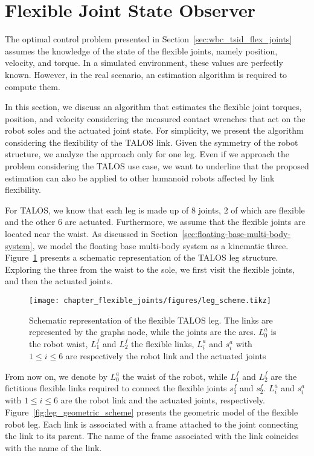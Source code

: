 \section{Flexible Joint State Observer\label{sec:flexible_joint_observer}}
The optimal control problem presented in Section~\ref{sec:wbc_tsid_flex_joints} assumes the knowledge of the state of the flexible joints, namely position, velocity, and torque.  In a simulated environment, these values are perfectly known. However, in the real scenario, an estimation algorithm is required to compute them.
\par
In this section, we discuss an algorithm that estimates the flexible joint torques, position, and velocity considering the measured contact wrenches that act on the robot soles and the actuated joint state. For simplicity, we present the algorithm considering the flexibility of the TALOS link. Given the symmetry of the robot structure, we analyze the approach only for one leg.
Even if we approach the problem considering the TALOS use case, we want to underline that the
proposed estimation can also be applied to other humanoid robots affected by link flexibility.
\par
For TALOS, we know that each leg is made up of $8$ joints, $2$ of which are flexible and the other $6$ are actuated. Furthermore, we assume that the flexible joints are located near the waist. As discussed in Section~\ref{sec:floating-base-multi-body-system}, we model the floating base multi-body
system as a kinematic three. Figure~\ref{fig:talos_leg_scheme} presents a schematic representation
of the TALOS leg structure. Exploring the three from the waist to the sole, we first visit the flexible joints, and then the actuated joints.
\begin{figure}[t]
    \centering
	\texttt{[image: chapter\_flexible\_joints/figures/leg\_scheme.tikz]}
	\caption[Schematic representation of the flexible TALOS leg.]{Schematic representation of the flexible TALOS leg. The links are represented by the graphs node, while the joints are the arcs. $L^a_0$ is the robot waist, $L^f_1$ and $L^f_2$ the flexible links, $L^a_i$ and  $s^a_i$ with $1\le i \le6$ are respectively the robot link and the actuated joints}
	\label{fig:talos_leg_scheme}
\end{figure}
From now on, we denote by $L^a_0$ the waist of the robot, while $L^f_1$ and $L^f_2$ are the fictitious flexible links required to connect the flexible joints $s_1^f$ and $s_2^f$. $L^a_i$ and  $s^a_i$ with $1\le i \le6$ are the robot link and the actuated joints, respectively. Figure~\ref{fig:leg_geometric_scheme} presents the geometric model of the flexible robot leg. Each link is associated with a frame attached to the joint connecting the link to its parent. The name of the frame associated with the link coincides with the name of the link. 
